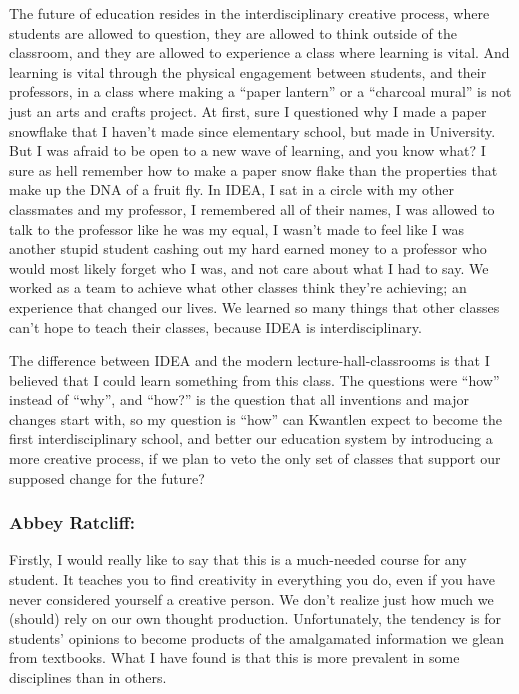 \documentclass[letterpaper,10pt,headsepline]{scrreprt}
\begin{document}
The future of education resides in the interdisciplinary creative process, where students are allowed to question, they are allowed to think outside of the classroom, and they are allowed to experience a class where learning is vital. And learning is vital through the physical engagement between students, and their professors, in a class where making a “paper lantern” or a “charcoal mural” is not just an arts and crafts project. At first, sure I questioned why I made a paper snowflake that I haven’t made since elementary school, but made in University. But I was afraid to be open to a new wave of learning, and you know what? I sure as hell remember how to make a paper snow flake than the properties that make up the DNA of a fruit fly. In IDEA, I sat in a circle with my other classmates and my professor, I remembered all of their names, I was allowed to talk to the professor like he was my equal, I wasn’t made to feel like I was another stupid student cashing out my hard earned money to a professor who would most likely forget who I was, and not care about what I had to say. We worked as a team to achieve what other classes think they’re achieving; an experience that changed our lives. We learned so many things that other classes can’t hope to teach their classes, because IDEA is interdisciplinary.

The difference between IDEA and the modern lecture-hall-classrooms is that I believed that I could learn something from this class. The questions were “how” instead of “why”, and “how?” is the question that all inventions and major changes start with, so my question is “how” can Kwantlen expect to become the first interdisciplinary school, and better our education system by introducing a more creative process, if we plan to veto the only set of classes that support our supposed change for the future?

\subsubsection{Abbey Ratcliff:}

Firstly, I would really like to say that this is a much-needed course for any student. It teaches you to find creativity in everything you do, even if you have never considered yourself a creative person. We don’t realize just how much we (should) rely on our own thought production. Unfortunately, the tendency is for students’ opinions to become products of the amalgamated information we glean from textbooks. What I have found is that this is more prevalent in some disciplines than in others. 
\end{document}

